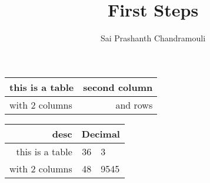\documentclass[a4paper,12pt,titlepage]{article} %
\author{Sai Prashanth Chandramouli}
\title{First Steps}
\begin{document}
	\begin{tabular}[t]{|p{36pt}|r|} %
		\hline
		this is a table & second column \\
		\hline
		with 2 columns & and rows \\
		\hline
	\end{tabular}
	
	\begin{tabular}[t]{r r @{.} l} 
		\hline
		desc & \multicolumn{2}{c}{Decimal}\\ %
		\hline
		this is a table & 36&3 \\
		\hline
		with 2 columns & 48&9545 \\
		\hline
	\end{tabular}
\end{document}

